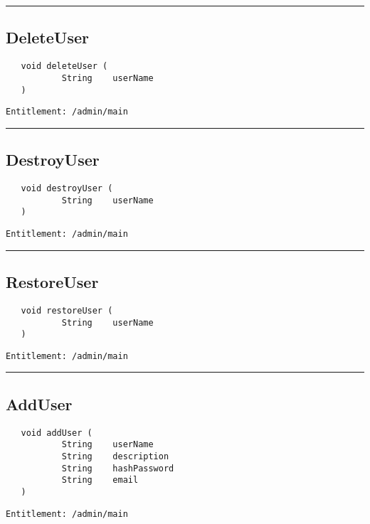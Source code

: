 \rule{12cm}{2pt}
\subsection{DeleteUser}
\label{Api:DeleteUser}
\begin{Verbatim}
   void deleteUser (
           String    userName
   )
\end{Verbatim}
\begin{Verbatim}[formatcom=\color{Maroon}]
  Entitlement: /admin/main
\end{Verbatim}



\rule{12cm}{2pt}
\subsection{DestroyUser}
\label{Api:DestroyUser}
\begin{Verbatim}
   void destroyUser (
           String    userName
   )
\end{Verbatim}
\begin{Verbatim}[formatcom=\color{Maroon}]
  Entitlement: /admin/main
\end{Verbatim}



\rule{12cm}{2pt}
\subsection{RestoreUser}
\label{Api:RestoreUser}
\begin{Verbatim}
   void restoreUser (
           String    userName
   )
\end{Verbatim}
\begin{Verbatim}[formatcom=\color{Maroon}]
  Entitlement: /admin/main
\end{Verbatim}



\rule{12cm}{2pt}
\subsection{AddUser}
\label{Api:AddUser}
\begin{Verbatim}
   void addUser (
           String    userName
           String    description
           String    hashPassword
           String    email
   )
\end{Verbatim}
\begin{Verbatim}[formatcom=\color{Maroon}]
  Entitlement: /admin/main
\end{Verbatim}



